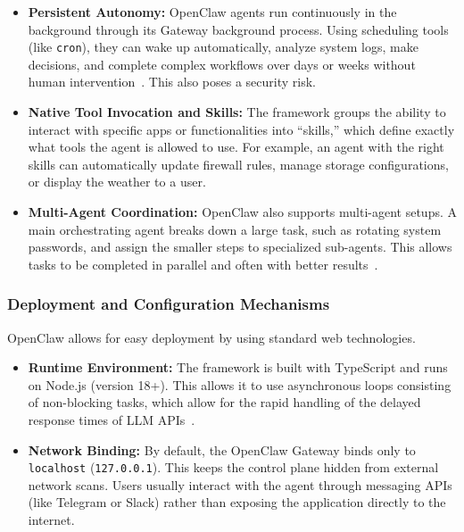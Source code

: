\documentclass[a4paper]{report}
\begin{document}
\begin{itemize}
    \item \textbf{Persistent Autonomy:} OpenClaw agents run continuously in the background through its Gateway background process. Using scheduling tools (like \texttt{cron}), they can wake up automatically, analyze system logs, make decisions, and complete complex workflows over days or weeks without human intervention~\cite{chen2025survey, sharma2025agentic}. This also poses a security risk.

    \item \textbf{Native Tool Invocation and Skills:} The framework groups the ability to interact with specific apps or functionalities into ``skills,'' which define exactly what tools the agent is allowed to use. For example, an agent with the right skills can automatically update firewall rules, manage storage configurations, or display the weather to a user.

    \item \textbf{Multi-Agent Coordination:} OpenClaw also supports multi-agent setups. A main orchestrating agent breaks down a large task, such as rotating system passwords, and assign the smaller steps to specialized sub-agents. This allows tasks to be completed in parallel and often with better results~\cite{anonymous2026four}.
\end{itemize}

\subsubsection{Deployment and Configuration Mechanisms}

OpenClaw allows for easy deployment by using standard web technologies.

\begin{itemize}
    \item \textbf{Runtime Environment:} The framework is built with TypeScript and runs on Node.js (version 18+). This allows it to use asynchronous loops consisting of non-blocking tasks, which allow for the rapid handling of the delayed response times of LLM APIs~\cite{foerster2026camels}.

    \item \textbf{Network Binding:} By default, the OpenClaw Gateway binds only to \texttt{localhost} (\texttt{127.0.0.1}). This keeps the control plane hidden from external network scans. Users usually interact with the agent through messaging APIs (like Telegram or Slack) rather than exposing the application directly to the internet.
\end{itemize}
\end{document}
